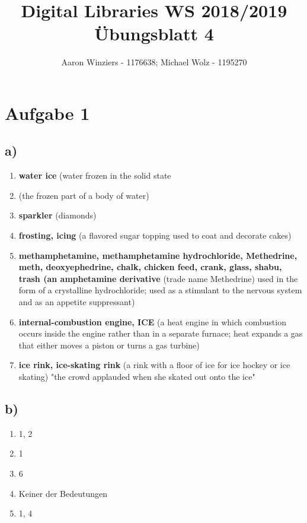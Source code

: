 \documentclass[11pt,a4paper,parskip=half ]{scrartcl}
\author{Aaron Winziers - 1176638; Michael Wolz - 1195270}
\title{Digital Libraries WS 2018/2019\\\LARGE{Übungsblatt 4}}
\begin{document}
	\maketitle
	
	\section*{Aufgabe 1}
	
	\subsection*{a)}
	\begin{enumerate}
		\item \textbf{water ice} (water frozen in the solid state
		\item (the frozen part of a body of water)
		\item \textbf{sparkler} (diamonds)
		\item \textbf{frosting, icing} (a flavored sugar topping used to coat and decorate cakes)
		\item \textbf{methamphetamine, methamphetamine hydrochloride, Methedrine, meth, deoxyephedrine, chalk, chicken feed, crank, glass, shabu, trash (an amphetamine derivative} (trade name Methedrine) used in the form of a crystalline hydrochloride; used as a stimulant to the nervous system and as an appetite suppressant)
		\item  \textbf{internal-combustion engine, ICE} (a heat engine in which combustion occurs inside the engine rather than in a separate furnace; heat expands a gas that either moves a piston or turns a gas turbine)
		\item  \textbf{ice rink, ice-skating rink} (a rink with a floor of ice for ice hockey or ice skating) "the crowd applauded when she skated out onto the ice"
	\end{enumerate}

	\subsection*{b)}
		\begin{enumerate}
			\item 1, 2
			\item 1
			\item 6
			\item Keiner der Bedeutungen
			\item 1, 4
		\end{enumerate}
		
\end{document}
